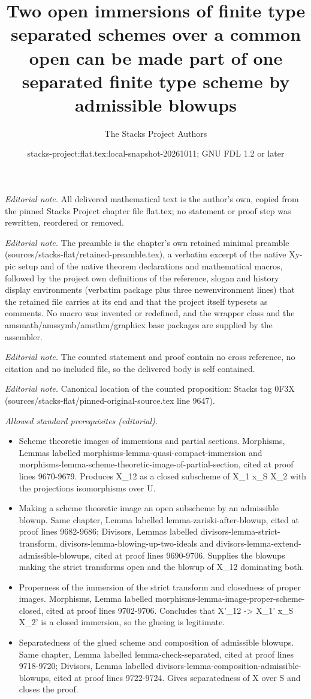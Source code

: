 \documentclass[10pt,a4paper]{amsart}
\title{Two open immersions of finite type separated schemes over a common open can be made part of one separated finite type scheme by admissible blowups}
\author{The Stacks Project Authors}
\date{stacks-project:flat.tex:local-snapshot-20261011; GNU FDL 1.2 or later}
\theoremstyle{plain}
\theoremstyle{definition}
\theoremstyle{remark}
\numberwithin{equation}{subsection}
\begin{document}
\maketitle
\noindent\textit{Editorial note.} All delivered mathematical text is the author's own, copied from the pinned Stacks Project chapter file flat.tex; no statement or proof step was rewritten, reordered or removed.\par\medskip
\noindent\textit{Editorial note.} The preamble is the chapter's own retained minimal preamble (sources/stacks-flat/retained-preamble.tex), a verbatim excerpt of the native Xy-pic setup and of the native theorem declarations and mathematical macros, followed by the project own definitions of the reference, slogan and history display environments (verbatim package plus three newenvironment lines) that the retained file carries at its end and that the project itself typesets as comments. No macro was invented or redefined, and the wrapper class and the amsmath/amssymb/amsthm/graphicx base packages are supplied by the assembler.\par\medskip
\noindent\textit{Editorial note.} The counted statement and proof contain no cross reference, no citation and no included file, so the delivered body is self contained.\par\medskip
\noindent\textit{Editorial note.} Canonical location of the counted proposition: Stacks tag 0F3X (sources/stacks-flat/pinned-original-source.tex line 9647).\par\medskip
\noindent\textit{Allowed standard prerequisites (editorial).}\begin{itemize}
\item Scheme theoretic images of immersions and partial sections. Morphisms, Lemmas labelled morphisms-lemma-quasi-compact-immersion and morphisms-lemma-scheme-theoretic-image-of-partial-section, cited at proof lines 9670-9679. Produces X\_12 as a closed subscheme of X\_1 x\_S X\_2 with the projections isomorphisms over U.
\item Making a scheme theoretic image an open subscheme by an admissible blowup. Same chapter, Lemma labelled lemma-zariski-after-blowup, cited at proof lines 9682-9686; Divisors, Lemmas labelled divisors-lemma-strict-transform, divisors-lemma-blowing-up-two-ideals and divisors-lemma-extend-admissible-blowups, cited at proof lines 9690-9706. Supplies the blowups making the strict transforms open and the blowup of X\_12 dominating both.
\item Properness of the immersion of the strict transform and closedness of proper images. Morphisms, Lemma labelled morphisms-lemma-image-proper-scheme-closed, cited at proof lines 9702-9706. Concludes that X'\_12 -> X\_1' x\_S X\_2' is a closed immersion, so the glueing is legitimate.
\item Separatedness of the glued scheme and composition of admissible blowups. Same chapter, Lemma labelled lemma-check-separated, cited at proof lines 9718-9720; Divisors, Lemma labelled divisors-lemma-composition-admissible-blowups, cited at proof lines 9722-9724. Gives separatedness of X over S and closes the proof.
\end{itemize}\medskip
\end{document}
